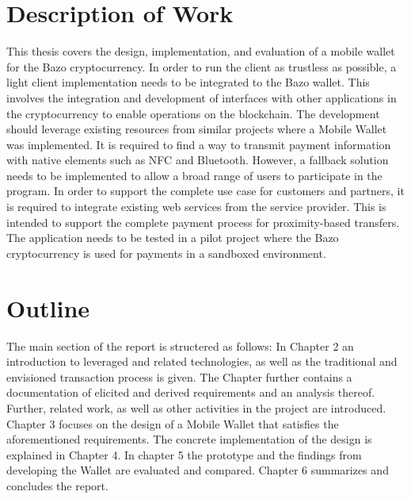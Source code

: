 \section{Description of Work}
This thesis covers the design, implementation, and evaluation of a mobile wallet for the Bazo cryptocurrency. In order to run the client as trustless as possible, a light client implementation needs to be integrated to the Bazo wallet. This involves the integration and development of interfaces with other applications in the cryptocurrency to enable operations on the blockchain.
The development should leverage existing resources from similar projects where a Mobile Wallet was implemented.
It is required to find a way to transmit payment information with native elements such as NFC and Bluetooth. However, a fallback solution needs to be implemented to allow a broad range of users to participate in the program.
In order to support the complete use case for customers and partners, it is required to integrate existing web services from the service provider. This is intended to support the complete payment process for proximity-based transfers.
The application needs to be tested in a pilot project where the Bazo cryptocurrency is used for payments in a sandboxed environment.

\section{Outline}
The main section of the report is structered as follows:
In Chapter 2 an introduction to leveraged and related technologies, as well as the traditional and envisioned transaction process is given. The Chapter further contains a documentation of elicited and derived requirements and an analysis thereof. Further, related work, as well as other activities in the project are introduced. Chapter 3 focuses on the design of a Mobile Wallet that satisfies the aforementioned requirements. The concrete implementation of the design is explained in Chapter 4. In chapter 5 the prototype and the findings from developing the Wallet are evaluated and compared.
Chapter 6 summarizes and concludes the report.